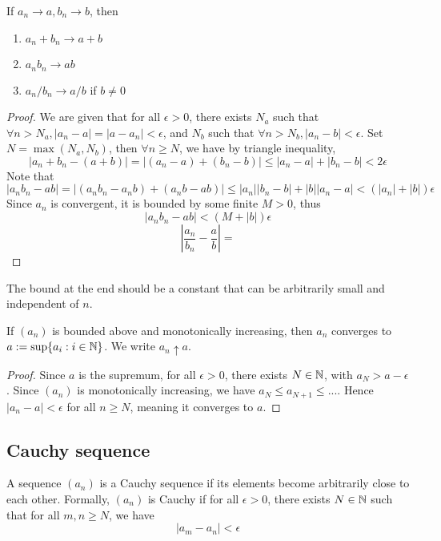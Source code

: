 \documentclass[11pt]{article}
\begin{document}
\begin{proposition}
  If \(a_n\to a,b_n\to b\), then 
  \begin{enumerate}
    \item \(a_n+b_n\to a+b\)
    \item \(a_nb_n\to ab\)
    \item \(a_n/b_n\to a/b\) if \(b\neq 0\)
  \end{enumerate}
\end{proposition}
\begin{proof}
  We are given that for all \(\epsilon>0\), there exists \(N_a\) such that \(\forall n>N_a,|a_n-a|=|a-a_n|<\epsilon\), and \(N_b\) such that \(\forall n>N_b,|a_n-b|<\epsilon\).
  \subproof{}
  Set \(N=\max(N_a,N_b)\), then \(\forall n\geq N\), we have by triangle inequality,
  \[|a_n+b_n-(a+b)|=|(a_n-a)+(b_n-b)|\leq|a_n-a|+|b_n-b|<2\epsilon\]
  \subproof{}
  Note that 
  \[|a_nb_n-ab|=|(a_nb_n-a_nb)+(a_nb-ab)|\leq |a_n||b_n-b|+|b||a_n-a|< (|a_n|+|b|)\epsilon\]
  Since \(a_n\) is convergent, it is bounded by some finite \(M>0\), thus \[|a_nb_n-ab|< (M+|b|)\epsilon\]
  \subproof{}
  \[\left|\frac{a_n}{b_n}-\frac{a}{b}\right|=\]
\end{proof}
\begin{remark}
  The bound at the end should be a constant that can be arbitrarily small and independent of \(n\).
\end{remark}

\begin{theorem}
  If \((a_n)\) is bounded above and monotonically increasing, then \(a_n\) converges to \(a:=\sup\{a_i:i\in\mathbb{N}\}\). We write \(a_n\uparrow a\).
\end{theorem}
\begin{proof}
  Since \(a\) is the supremum, for all \(\epsilon>0\), there exists \(N\in\mathbb{N}\), with \(a_N>a-\epsilon\). Since \((a_n)\) is monotonically increasing, we have \(a_N\leq a_{N+1}\leq...\). Hence \(|a_n-a|<\epsilon\) for all \(n\geq N\), meaning it converges to \(a\).
\end{proof}

\subsection{Cauchy sequence}
\begin{definition}
  A sequence \((a_n)\) is a Cauchy sequence if its elements become arbitrarily close to each other. Formally, \((a_n)\) is Cauchy if for all \(\epsilon>0\), there exists \(N\in\mathbb{N}\) such that for all \(m,n\geq N\), we have 
  \[|a_m-a_n|<\epsilon\]  
\end{definition}
\end{document}
